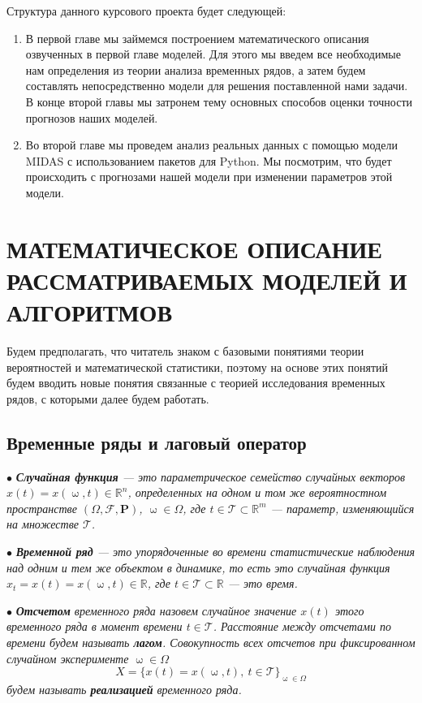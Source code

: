 \documentclass[a4paper, 12pt]{extarticle}
\numberwithin{equation}{subsection}
\newcommand{\Rm}{\mathbb{R}}
\renewcommand{\omega}{\upomega}
\begin{document}
	Структура данного курсового проекта будет следующей:
	\begin{enumerate}
		\item В первой главе мы займемся построением математического описания озвученных в первой главе моделей. Для этого мы введем все необходимые нам определения из теории анализа временных рядов, а затем будем составлять непосредственно модели для решения поставленной нами задачи. В конце второй главы мы затронем тему основных способов оценки точности прогнозов наших моделей.
		\item Во второй главе мы проведем анализ реальных данных с помощью модели MIDAS с использованием пакетов для Python. Мы посмотрим, что будет происходить с прогнозами нашей модели при изменении параметров этой модели.
	\end{enumerate}
	\newpage

	\section{МАТЕМАТИЧЕСКОЕ ОПИСАНИЕ РАССМАТРИВАЕМЫХ МОДЕЛЕЙ И АЛГОРИТМОВ}
	Будем предполагать, что читатель знаком с базовыми понятиями теории вероятностей и математической статистики, поэтому на основе этих понятий будем вводить новые понятия связанные с теорией исследования временных рядов, с которыми далее будем работать.
	\subsection{Временные ряды и лаговый оператор}
	$\bullet$ \textit{\textbf{Случайная функция} --- это параметрическое семейство случайных векторов $x(t) = x(\omega, t)\in \Rm^n$, определенных на одном и том же вероятностном пространстве $(\Omega, \mathcal{F}, \mathbf{P})$, $\omega \in \Omega$, где $t \in \mathcal{T} \subset \Rm^m$ --- параметр, изменяющийся на множестве $\mathcal{T}$.}
	
	$\bullet$ \textit{\textbf{Временной ряд} --- это упорядоченные во времени статистические наблюдения над одним и тем же объектом в динамике, то есть это случайная функция $x_t = x(t) = x(\omega, t)\in\Rm$, где $t \in \mathcal{T} \subset \Rm$ --- это время.}
	
	$\bullet$ \textit{\textbf{Отсчетом} временного ряда назовем случайное значение $x(t)$ этого временного ряда в момент времени $t \in \mathcal{T}$. Расстояние между отсчетами по времени будем называть \textbf{лагом}. Совокупность всех отсчетов при фиксированном случайном эксперименте $\omega \in \Omega$ \begin{equation}
			X = \{x(t) = x(\omega, t),\ t\in \mathcal T \}_{\omega \in \Omega}
		\end{equation} будем называть \textbf{реализацией} временного ряда.}
	
\end{document}
